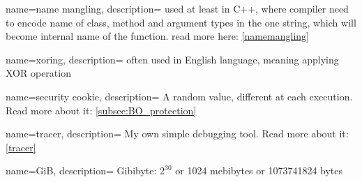 {
  name=name mangling,
  description={
  {used at least in C++, where compiler need to encode name of class, method and argument types in the one string,
  which will become internal name of the function. read more here}: \ref{namemangling}}
}

{
  name=xoring,
  description={
  {often used in English language, meaning applying \ac{XOR} operation}}
}

{
  name=security cookie,
  description={
  {A random value, different at each execution. Read more about it}: \ref{subsec:BO_protection}}
}

{
  name=tracer,
  description={
  {My own simple debugging tool. Read more about it}: \ref{tracer}}
}

{
  name=GiB,
  description={
  {Gibibyte: $2^{30}$ or 1024 mebibytes or 1073741824 bytes}}
}
